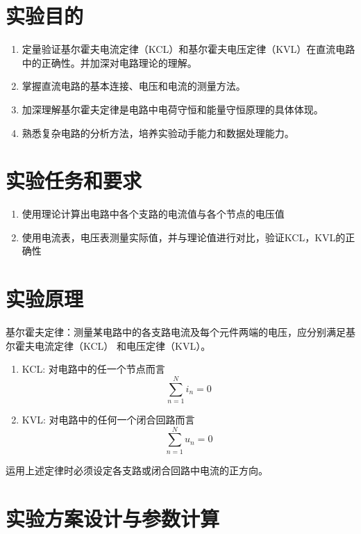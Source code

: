 \documentclass{Report} %
\begin{document}
\makecover

\section{实验目的}
\begin{enumerate}
    \item 定量验证基尔霍夫电流定律（KCL）和基尔霍夫电压定律（KVL）在直流电路中的正确性。并加深对电路理论的理解。

    \item 掌握直流电路的基本连接、电压和电流的测量方法。

    \item 加深理解基尔霍夫定律是电路中电荷守恒和能量守恒原理的具体体现。

    \item 熟悉复杂电路的分析方法，培养实验动手能力和数据处理能力。
\end{enumerate}

\section{实验任务和要求}
\begin{enumerate}
    \item 使用理论计算出电路中各个支路的电流值与各个节点的电压值
    \item 使用电流表，电压表测量实际值，并与理论值进行对比，验证KCL，KVL的正确性
\end{enumerate}
\section{实验原理}
基尔霍夫定律：测量某电路中的各支路电流及每个元件两端的电压，应分别满足基尔霍夫电流定律（KCL）
和电压定律（KVL）。
\begin{enumerate}
    \item KCL: 对电路中的任一个节点而言
    \begin{equation}
        \sum_{n=1}^{N} i_n = 0
    \end{equation}
    \item KVL: 对电路中的任何一个闭合回路而言
    \begin{equation}
        \sum_{n=1}^{N} u_n = 0
    \end{equation}
\end{enumerate}
运用上述定律时必须设定各支路或闭合回路中电流的正方向。
\section{实验方案设计与参数计算}
\end{document}
